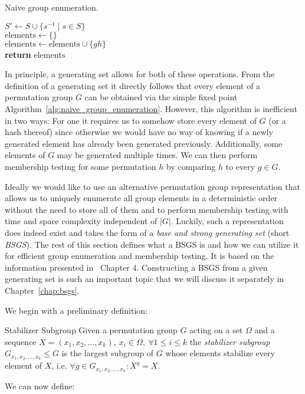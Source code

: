 \begin{algorithm}
  \caption{Naive group enumeration.}
  \label{alg:naive_group_enumeration}
  \begin{algorithmic}[1]
       \State $S' \gets S \cup \{s^{-1} \mid s \in S\}$
       \\
       \State $\mathrm{elements} \gets \{\}$
       \\
            \State $\mathrm{elements} \gets \mathrm{elements} \cup \{gh\}$
          \EndFor
       \EndWhile
       \\
       \State \textbf{return} $\mathrm{elements}$
    \EndProcedure
  \end{algorithmic}
\end{algorithm}

\noindent
In principle, a generating set allows for both of these operations. From the
definition of a generating set it directly follows that every element of a
permutation group $G$ can be obtained via the simple fixed point
Algorithm~\ref{alg:naive_group_enumeration}. However, this algorithm is
inefficient in two ways: For one it requires us to somehow store every element
of $G$ (or a hash thereof) since otherwise we would have no way of knowing if a
newly generated element has already been generated previously. Additionally,
some elements of $G$ may be generated multiple times. We can then perform
membership testing for some permutation $h$ by comparing $h$ to every $g \in G$.

Ideally we would like to use an alternative permutation group representation
that allows us to uniquely enumerate all group elements in a deterministic
order without the need to store all of them and to perform membership testing
with time and space complexity independent of $|G|$.  Luckily, such a
representation does indeed exist and takes the form of a \textit{base and
strong generating set} (short \textit{BSGS}).  The rest of this section defines
what a BSGS is and how we can utilize it for efficient group enumeration and
membership testing. It is based on the information presented in~\cite{Holt}
Chapter 4. Constructing a BSGS from a given generating set is such an important
topic that we will discuss it separately in
Chapter~\ref{chap:bsgs}.

We begin with a preliminary definition:

\begin{defn}{Stabilizer Subgroup}{}
  Given a permutation group $G$ acting on a set $\Omega$ and a sequence $X =
  (x_1, x_2, \dots, x_k),\ x_i \in \Omega,\ \forall 1 \leq i \leq k$ the
  \textit{stabilizer subgroup} $G_{x_1, x_2, \dots, x_k} \leq G$ is the largest
  subgroup of $G$ whose elements stabilize every element of $X$, i.e.
  $\forall g \in G_{x_1, x_2, \dots, x_k}: X^g = X$.
\end{defn}
%
We can now define:

